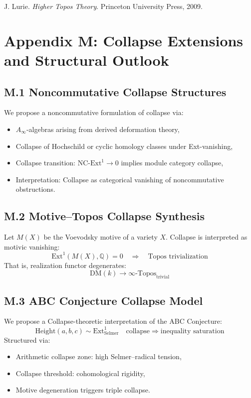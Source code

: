 \documentclass[11pt]{article}
\begin{document}
\begin{axiom}
\begin{axiom}
{{\begin{thebibliography}{9}
J. Lurie.  
\textit{Higher Topos Theory}. Princeton University Press, 2009.

\end{thebibliography}




\section*{Appendix M: Collapse Extensions and Structural Outlook}

\subsection*{M.1 Noncommutative Collapse Structures}

We propose a noncommutative formulation of collapse via:
\begin{itemize}
  \item $A_\infty$-algebras arising from derived deformation theory,
  \item Collapse of Hochschild or cyclic homology classes under Ext-vanishing,
  \item Collapse transition: $\mathrm{NC\text{-}Ext}^1 \to 0$ implies module category collapse,
  \item Interpretation: Collapse as categorical vanishing of noncommutative obstructions.
\end{itemize}

\subsection*{M.2 Motive–Topos Collapse Synthesis}

Let $M(X)$ be the Voevodsky motive of a variety $X$.  
Collapse is interpreted as motivic vanishing:
\[
\mathrm{Ext}^1(M(X), \mathbb{Q}) = 0 \quad \Rightarrow \quad \text{Topos trivialization}
\]
That is, realization functor degenerates:
\[
\mathrm{DM}(k) \to \infty\text{-Topos}_{\text{trivial}}
\]

\subsection*{M.3 ABC Conjecture Collapse Model}

We propose a Collapse-theoretic interpretation of the ABC Conjecture:
\[
\text{Height}(a,b,c) \sim \mathrm{Ext}^1_{\text{Selmer}} \quad \text{collapse} \Rightarrow \text{inequality saturation}
\]
Structured via:
\begin{itemize}
  \item Arithmetic collapse zone: high Selmer–radical tension,
  \item Collapse threshold: cohomological rigidity,
  \item Motive degeneration triggers triple collapse.
\end{itemize}

}}
\end{axiom}
\end{axiom}
\end{document}
